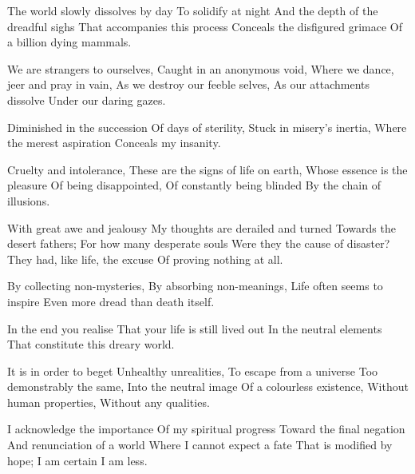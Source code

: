 \documentclass{article}
\newenvironment{stanza}{\begin{minipage}{10cm}\begin{internallinenumbers}\obeylines}{\end{internallinenumbers}\end{minipage}\vspace{\baselineskip}}
\begin{document}
\begin{stanza}
The world slowly dissolves by day
To solidify at night
And the depth of the dreadful sighs
That accompanies this process
Conceals the disfigured grimace
Of a billion dying mammals.
\end{stanza}

\begin{stanza}
We are strangers to ourselves,
Caught in an anonymous void,
Where we dance, jeer and pray in vain,
As we destroy our feeble selves,
As our attachments dissolve
Under our daring gazes.
\end{stanza}

\begin{stanza}
Diminished in the succession
Of days of sterility,
Stuck in misery's inertia,
Where the merest aspiration
Conceals my insanity.
\end{stanza}

\begin{stanza}
Cruelty and intolerance,
These are the signs of life on earth,
Whose essence is the pleasure
Of being disappointed,
Of constantly being blinded
By the chain of illusions.
\end{stanza}

\begin{stanza}
With great awe and jealousy
My thoughts are derailed and turned
Towards the desert fathers;
For how many desperate souls
Were they the cause of disaster?
They had, like life, the excuse
Of proving nothing at all.
\end{stanza}

\begin{stanza}
By collecting non-mysteries,
By absorbing non-meanings,
Life often seems to inspire
Even more dread than death itself.
\end{stanza}

\begin{stanza}
In the end you realise
That your life is still lived out
In the neutral elements
That constitute this dreary world.
\end{stanza}

\begin{stanza}
It is in order to beget
Unhealthy unrealities,
To escape from a universe
Too demonstrably the same,
Into the neutral image
Of a colourless existence,
Without human properties,
Without any qualities.
\end{stanza}

\begin{stanza}
I acknowledge the importance
Of my spiritual progress
Toward the final negation
And renunciation of a world
Where I cannot expect a fate
That is modified by hope;
I am certain I am less.
\end{stanza}
\end{document}

